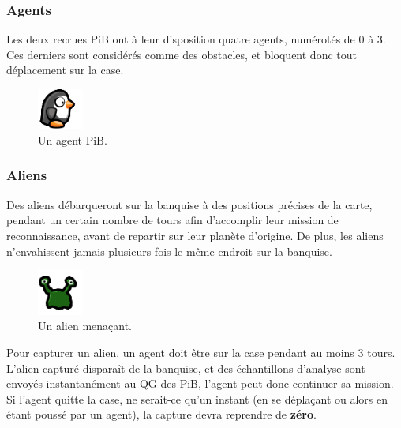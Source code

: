 \subsubsection{Agents}\label{agents}

Les deux recrues PiB ont à leur disposition quatre agents, numérotés de
0 à 3. Ces derniers sont considérés comme des obstacles, et bloquent
donc tout déplacement sur la case.

\begin{figure}[!h]
    \centering
    \includegraphics[width=1.5cm]{img/penguin}
    \caption*{Un agent PiB.}
\end{figure}

\subsubsection{Aliens}\label{aliens}

Des aliens débarqueront sur la banquise à des positions précises de la
carte, pendant un certain nombre de tours afin d'accomplir leur mission
de reconnaissance, avant de repartir sur leur planète d'origine. De
plus, les aliens n'envahissent jamais plusieurs fois le même endroit sur
la banquise.

\begin{figure}[!h]
    \centering
    \includegraphics[width=1.5cm]{img/alien}
    \caption*{Un alien menaçant.}
\end{figure}

Pour capturer un alien, un agent doit être sur la case pendant au moins
3 tours. L'alien capturé disparaît de la banquise, et des échantillons
d'analyse sont envoyés instantanément au QG des PiB, l'agent peut donc
continuer sa mission. Si l'agent quitte la case, ne serait-ce qu'un
instant (en se déplaçant ou alors en étant poussé par un agent), la
capture devra reprendre de \textbf{zéro}.


